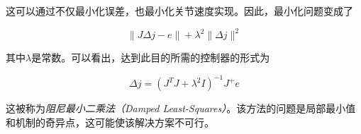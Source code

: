 这可以通过不仅最小化误差，也最小化关节速度实现。因此，最小化问题变成了

\begin{equation}
\|J\Delta j-e\|+\lambda^2\|\Delta j\|^2
\end{equation}


其中$\lambda$是常数。可以看出，达到此目的所需的控制器的形式为

\begin{equation}
\Delta j=(J^TJ+\lambda^2 I)^{-1}J^+e
\end{equation}


这被称为\emph{阻尼最小二乘法（Damped Least-Squares）}。该方法的问题是局部最小值和机制的奇异点，这可能使该解决方案不可行。
